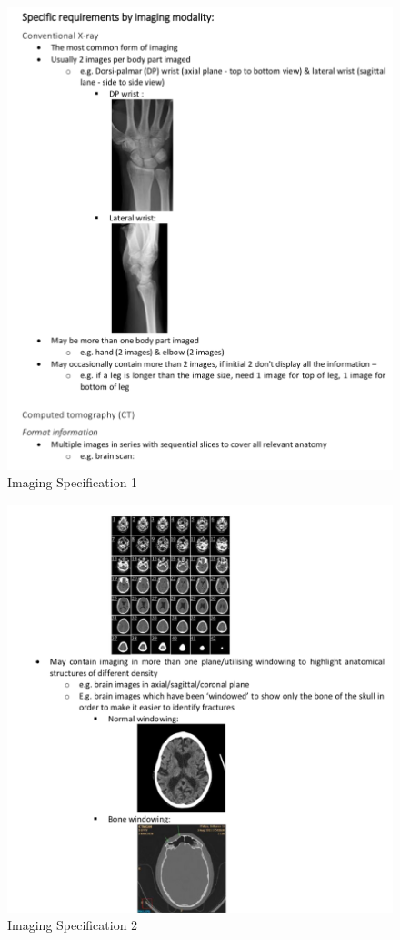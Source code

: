 \begin{figure}[ht]
\centering
\includegraphics[width = 0.93\hsize]{./figures/ImagingSpec1}
\caption{Imaging Specification 1}
\end{figure}
\clearpage

\begin{figure}[ht]
\centering
\includegraphics[width = 0.95\hsize]{./figures/ImagingSpec2}
\caption{Imaging Specification 2}
\end{figure}
\clearpage

